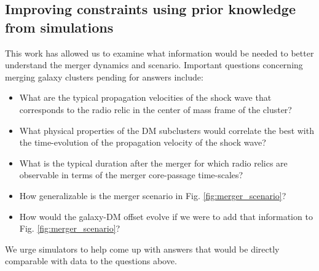%
\subsection{Improving constraints using prior knowledge from simulations}
This work has allowed us to examine
what information would be needed to better understand the merger
dynamics and scenario. Important questions concerning merging galaxy
clusters pending for answers include:  
\begin{itemize}
\item What are the typical propagation velocities of the shock wave that
corresponds to the radio relic in the	center of mass frame of the cluster?
\item What physical properties of the DM subclusters would correlate the
	best with the time-evolution of the propagation velocity of the shock wave?  
\item What is the typical duration
after the merger for which radio relics are observable in terms of the merger
core-passage time-scales? 
\item How generalizable is the merger scenario in Fig.
	\ref{fig:merger_scenario}?  
\item How would the galaxy-DM offset evolve if we were to add that information
	to Fig. \ref{fig:merger_scenario}?
\end{itemize}
We urge simulators to help come up with answers that would be directly
comparable with data to the questions above.  
